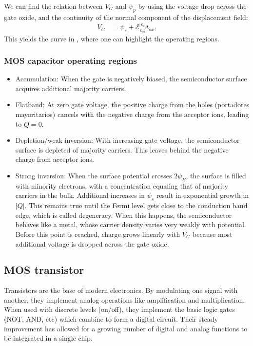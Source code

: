 We can find the relation between $V_G$ and $\psi_p$ by
using the voltage drop across the gate oxide,
and the continuity of the normal component of the displacement field:
\begin{align}
    V_G &= \psi_s + \mathscr{E}\frac{\epsilon_s}{\epsilon_{ox}}t_{ox}.
    \label{eq:potencial_campo_mos}
\end{align}
This yields the curve in ,
where one can highlight the operating regions.
%
\subsubsection{MOS capacitor operating regions}
\begin{itemize}
    \item Accumulation:
        When the gate is negatively biased,
        the semiconductor surface acquires additional majority carriers.
    \item Flatband:
        At zero gate voltage, the positive charge from the holes
        (portadores mayoritarios)
        cancels with the negative charge from the acceptor ions,
        leading to $Q=0$. 
    \item Depletion/weak inversion:
        With increasing gate voltage,
        the semiconductor surface is depleted of majority carriers.
        This leaves behind the negative charge from acceptor ions.
    \item Strong inversion:
        When the surface potential crosses $2\psi_B$,
        the surface is filled with minority electrons,
        with a concentration equaling that of majority carriers in the bulk.
        Additional increases in $\psi_s$ result in exponential growth in
        $|Q|$.
        This remains true until the Fermi level gets close to 
        the conduction band edge, which is called degeneracy.
        When this happens, the semiconductor behaves like a metal,
        whose carrier density varies very weakly with potential.
        Before this point is reached,
        charge grows linearly with $V_G$
        because most additional voltage is dropped across the gate oxide.
\end{itemize}
%
%
\subsection{MOS transistor}
Transistors are the base of modern electronics.
By modulating one signal with another,
they implement analog operations like amplification and multiplication.
When used with discrete levels (on/off),
they implement the basic logic gates (NOT, AND, etc)
which combine to form a digital circuit.
Their steady improvement has allowed for a growing number of 
digital and analog functions
to be integrated in a single chip.
%
